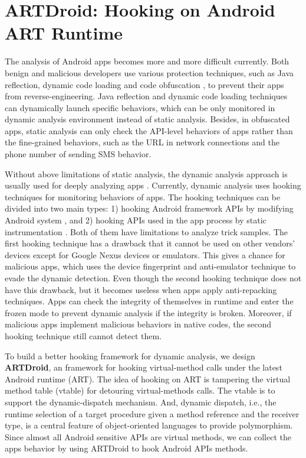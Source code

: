 \chapter{ARTDroid: Hooking on Android ART Runtime}

The analysis of Android apps becomes more and more difficult currently. Both benign and malicious developers use various protection techniques, such as Java reflection, dynamic code loading and code obfuscation \cite{rastogi2013droidchameleon}, to prevent their apps from reverse-engineering. Java reflection and dynamic code loading techniques can dynamically launch specific behaviors, which can be only monitored in dynamic analysis environment instead of static analysis. Besides, in obfuscated apps, static analysis can only check the API-level behaviors of apps rather than the fine-grained behaviors, such as the URL in network connections and the phone number of sending SMS behavior.

Without above limitations of static analysis, the dynamic analysis approach is usually used for deeply analyzing apps \cite{spreitzenbarth2013mobile}. Currently, dynamic analysis uses hooking techniques for monitoring behaviors of apps. The hooking techniques can be divided into two main types: 1) hooking Android framework APIs by modifying Android system \cite{zhauniarovich2015stadyna}\cite{enck2014taintdroid}, and 2) hooking APIs used in the app process by static instrumentation \cite{backes2013appguard}\cite{davis2013retroskeleton}. Both of them have limitations to analyze trick samples. The first hooking technique has a drawback that it cannot be used on other vendors' devices except for Google Nexus devices or emulators. This gives a chance for malicious apps, which uses the device fingerprint and anti-emulator technique to evade the dynamic detection. Even though the second hooking technique does not have this drawback, but it becomes useless when apps apply anti-repacking techniques. Apps can check the integrity of themselves in runtime and enter the frozen mode to prevent dynamic analysis if the integrity is broken. Moreover, if malicious apps implement malicious behaviors in native codes, the second hooking technique still cannot detect them.


To build a better hooking framework for dynamic analysis, we design \textbf{ARTDroid}, an framework for hooking virtual-method calls under the latest Android runtime (ART). The idea of hooking on ART is tampering the virtual method table (vtable) for detouring virtual-methods calls. The vtable is to support the dynamic-dispatch mechanism. And, dynamic dispatch, i.e., the runtime selection of a target procedure given a method reference and the receiver type, is a central feature of object-oriented languages to provide polymorphism. Since almost all Android sensitive APIs are virtual methods, we can collect the apps behavior by using ARTDroid to hook Android APIs methods.


